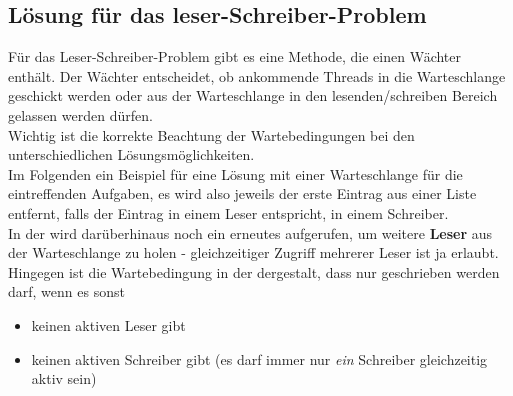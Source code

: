 \subsection*{Lösung für das leser-Schreiber-Problem}

Für das Leser-Schreiber-Problem gibt es eine Methode, die einen Wächter enthält.
Der Wächter entscheidet, ob ankommende Threads in die Warteschlange geschickt werden oder aus der Warteschlange in den lesenden/schreiben Bereich gelassen werden dürfen.\\

\noindent
Wichtig ist die korrekte Beachtung der Wartebedingungen bei den unterschiedlichen Lösungsmöglichkeiten.\\

\noindent
Im Folgenden ein Beispiel für eine Lösung mit einer Warteschlange für die eintreffenden Aufgaben, es wird also jeweils der erste Eintrag aus einer Liste entfernt, falls der Eintrag in  einem Leser entspricht, in  einem Schreiber.\\
In der  wird darüberhinaus noch ein erneutes  aufgerufen, um weitere \textbf{Leser} aus der Warteschlange zu holen - gleichzeitiger Zugriff mehrerer Leser ist ja erlaubt.\\
Hingegen ist die Wartebedingung in der  dergestalt, dass nur geschrieben werden darf, wenn es sonst
\begin{itemize}
    \item keinen aktiven Leser gibt
    \item keinen aktiven Schreiber gibt (es darf immer nur \textit{ein} Schreiber gleichzeitig aktiv sein)
\end{itemize}



